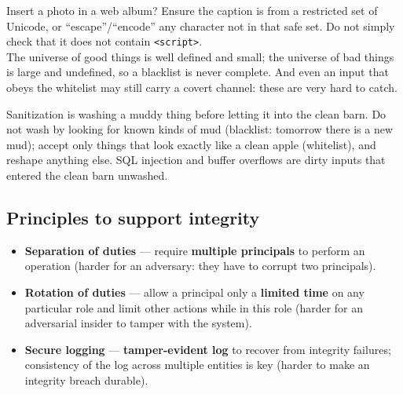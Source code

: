 \begin{exbox}[title=XSS]
Insert a photo in a web album? Ensure the caption is from a restricted set of Unicode, or
``escape''/``encode'' any character not in that safe set. Do not simply check that it
does not contain \texttt{<script>}. \\
The universe of good things is well defined and small; the universe of bad things is large and
undefined, so a blacklist is never complete. And even an input that obeys the whitelist may still
carry a covert channel: these are very hard to catch.
\end{exbox}

\begin{goatbox}
Sanitization is washing a muddy thing before letting it into the clean barn. Do not wash by
looking for known kinds of mud (blacklist: tomorrow there is a new mud); accept only things that
look exactly like a clean apple (whitelist), and reshape anything else. SQL injection and buffer
overflows are dirty inputs that entered the clean barn unwashed.
\end{goatbox}

\subsection{Principles to support integrity}

\begin{defnbox}[title=Three principles to support integrity]
\begin{itemize}
  \item \textbf{Separation of duties} --- require \textbf{multiple principals} to perform
        an operation (harder for an adversary: they have to corrupt two principals).
  \item \textbf{Rotation of duties} --- allow a principal only a \textbf{limited time} on
        any particular role and limit other actions while in this role (harder for an
        adversarial insider to tamper with the system).
  \item \textbf{Secure logging} --- \textbf{tamper-evident log} to recover from integrity
        failures; consistency of the log across multiple entities is key (harder to make
        an integrity breach durable).
\end{itemize}
\end{defnbox}


